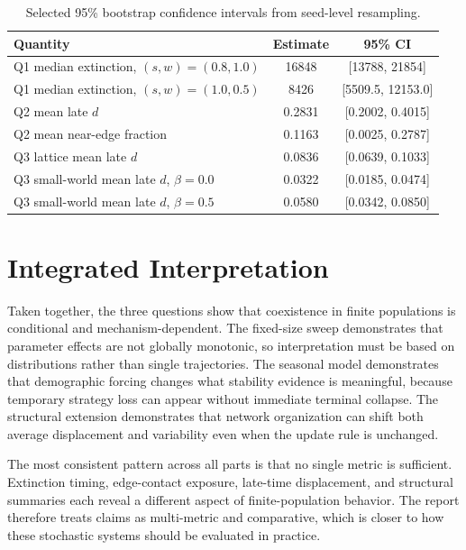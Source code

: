 \documentclass[11pt,a4paper]{article}
\begin{document}
\begin{table}[!htbp]
\centering
\small
\caption{Selected 95\% bootstrap confidence intervals from seed-level resampling.}
\label{tab:uncertainty}
\begin{tabular}{p{}cc}
\toprule
Quantity & Estimate & 95\% CI \\
\midrule
Q1 median extinction, $(s,w)=(0.8,1.0)$ & 16848 & [13788, 21854] \\
Q1 median extinction, $(s,w)=(1.0,0.5)$ & 8426 & [5509.5, 12153.0] \\
Q2 mean late $d$ & 0.2831 & [0.2002, 0.4015] \\
Q2 mean near-edge fraction & 0.1163 & [0.0025, 0.2787] \\
Q3 lattice mean late $d$ & 0.0836 & [0.0639, 0.1033] \\
Q3 small-world mean late $d$, $\beta=0.0$ & 0.0322 & [0.0185, 0.0474] \\
Q3 small-world mean late $d$, $\beta=0.5$ & 0.0580 & [0.0342, 0.0850] \\
\bottomrule
\end{tabular}
\end{table}

\clearpage

\section{Integrated Interpretation}
Taken together, the three questions show that coexistence in finite populations is conditional and mechanism-dependent. The fixed-size sweep demonstrates that parameter effects are not globally monotonic, so interpretation must be based on distributions rather than single trajectories. The seasonal model demonstrates that demographic forcing changes what stability evidence is meaningful, because temporary strategy loss can appear without immediate terminal collapse. The structural extension demonstrates that network organization can shift both average displacement and variability even when the update rule is unchanged.

The most consistent pattern across all parts is that no single metric is sufficient. Extinction timing, edge-contact exposure, late-time displacement, and structural summaries each reveal a different aspect of finite-population behavior. The report therefore treats claims as multi-metric and comparative, which is closer to how these stochastic systems should be evaluated in practice.
\end{document}
